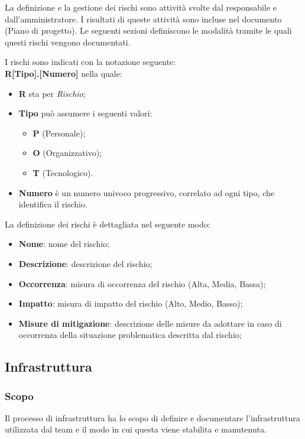 \documentclass[10pt, a4paper]{article}
\begin{document}
La definizione e la gestione dei rischi sono attività svolte dal responsabile e dall'amministratore.
I risultati di queste attività sono incluse nel documento (Piano di progetto).
Le seguenti sezioni definiscono le modalità tramite le quali questi rischi vengono documentati.

I rischi sono indicati con la notazione seguente:\\
\textbf{R[Tipo].[Numero]}
nella quale:
\begin{itemize}
\item \textbf{R} sta per \textit{Rischio};
\item \textbf{Tipo} può assumere i seguenti valori:
    \begin{itemize}
	\item \textbf{P} (Personale);
	\item \textbf{O} (Organizzativo);
	\item \textbf{T} (Tecnologico).
    \end{itemize}
\item \textbf{Numero} è un numero univoco progressivo, correlato ad ogni tipo, che identifica il rischio.
\end{itemize}

La definizione dei rischi è dettagliata nel seguente modo:
\begin{itemize}
    \item \textbf{Nome}: nome del rischio;
    \item \textbf{Descrizione}: descrizione del rischio;
    \item \textbf{Occorrenza}: misura di occorrenza del rischio (Alta, Media, Bassa);
    \item \textbf{Impatto}: misura di impatto del rischio (Alto, Medio, Basso);
    \item \textbf{Misure di mitigazione}: descrizione delle misure da adottare in caso di occorrenza della situazione problematica descritta dal rischio;
\end{itemize}

\subsection{Infrastruttura}
\subsubsection{Scopo}
Il processo di infrastruttura ha lo scopo di definire e documentare l'infrastruttura utilizzata dal team e il modo in cui questa viene stabilita e manutenuta.
\end{document}
